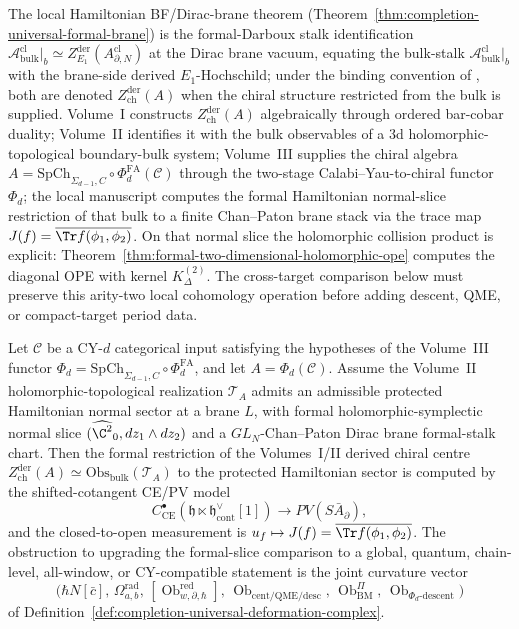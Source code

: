 The local Hamiltonian BF/Dirac-brane theorem
(Theorem~\ref{thm:completion-universal-formal-brane}) is the
formal-Darboux stalk identification
\(\mathcal A^{\mathrm{cl}}_{\mathrm{bulk}}|_b\simeq
Z^{\mathrm{der}}_{E_1}(A^{\mathrm{cl}}_{\partial,N})\) at the
Dirac brane vacuum, equating the bulk-stalk
\(\mathcal A^{\mathrm{cl}}_{\mathrm{bulk}}|_b\) with the brane-side
derived \(E_1\)-Hochschild; under the binding convention of
, both are denoted
\(Z^{\mathrm{der}}_{\mathrm{ch}}(A)\) when the chiral structure
restricted from the bulk is supplied.
Volume~I constructs \(Z^{\mathrm{der}}_{\mathrm{ch}}(A)\)
algebraically through ordered bar-cobar duality; Volume~II
identifies it with the bulk observables of a 3d
holomorphic-topological boundary-bulk system; Volume~III supplies
the chiral algebra
\(A=\mathrm{SpCh}_{\Sigma_{d-1},C}\circ\Phi^{\mathrm{FA}}_d(\mathcal C)\)
through the two-stage Calabi--Yau-to-chiral functor
\(\Phi_d\); the local manuscript computes the formal Hamiltonian
normal-slice restriction of that bulk to a finite Chan--Paton
brane stack via the trace map
\(J(f)=\overline{\Tr f(\phi_1,\phi_2)}\).
On that normal slice the holomorphic collision product is explicit:
Theorem~\ref{thm:formal-two-dimensional-holomorphic-ope}
computes the diagonal OPE with kernel \(K^{(2)}_\Delta\).  The
cross-target comparison below must preserve this arity-two local
cohomology operation before adding descent, QME, or compact-target
period data.

\begin{thm}
\label{thm:completion-cross-target-slice}
Let \(\mathcal C\) be a CY-\(d\) categorical input satisfying the
hypotheses of the Volume~III functor
\(\Phi_d=\mathrm{SpCh}_{\Sigma_{d-1},C}\circ\Phi^{\mathrm{FA}}_d\),
and let \(A=\Phi_d(\mathcal C)\).  Assume the Volume~II
holomorphic-topological realization \(\mathcal T_A\) admits an
admissible protected Hamiltonian normal sector at a brane \(L\),
with formal holomorphic-symplectic normal slice
\((\widehat{\C^2}_0,dz_1\wedge dz_2)\) and a \(GL_N\)-Chan--Paton
Dirac brane formal-stalk chart.  Then the formal restriction of the Volumes~I/II
derived chiral centre \(Z^{\mathrm{der}}_{\mathrm{ch}}(A)\simeq
\mathrm{Obs}_{\mathrm{bulk}}(\mathcal T_A)\) to the protected
Hamiltonian sector is computed by the shifted-cotangent CE/PV
model
\[
  C^\bullet_{\mathrm{CE}}(\mathfrak h\ltimes
   \mathfrak h^\vee_{\mathrm{cont}}[1])\longrightarrow PV(S\bar A_\partial),
\]
and the closed-to-open measurement is
\(u_f\mapsto J(f)=\overline{\Tr f(\phi_1,\phi_2)}\).  The
obstruction to upgrading the formal-slice comparison to a global,
quantum, chain-level, all-window, or CY-compatible statement is
the joint curvature vector
\[
  \bigl(\hbar N[\bar c],\,
   \Omega^{\mathrm{rad}}_{a,b},\,
   [\operatorname{Ob}^{\mathrm{red}}_{w,\partial,\hbar}],\,
   \operatorname{Ob}_{\mathrm{cent/QME/desc}},\,
   \operatorname{Ob}^\Pi_{\mathrm{BM}},\,
   \operatorname{Ob}_{\Phi_d\text{-descent}}\bigr)
\]
of Definition~\ref{def:completion-universal-deformation-complex}.
\end{thm}

